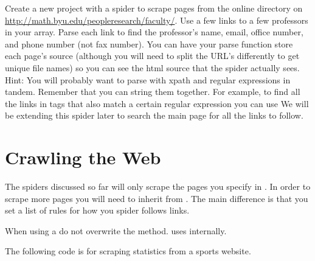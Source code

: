 \begin{problem}
Create a new project with a spider to scrape pages from the online directory on \url{http://math.byu.edu/peopleresearch/faculty/}. Use a few links to a few professors in your  array. Parse each link to find the professor's name, email, office number, and phone number (not fax number). You can have your parse function store each page's source (although you will need to split the URL's differently to get unique file names) so you can see the html source that the spider actually sees.
Hint: You will probably want to parse with xpath and regular expressions in tandem. Remember that you can string them together. For example, to find all the  links in  tags that also match a certain regular expression you can use 
We will be extending this spider later to search the main page for all the links to follow.
\end{problem}

\section*{Crawling the Web}
The spiders discussed so far will only scrape the pages you specify in . In order to scrape more pages you will need to inherit from . The main difference is that you set a list of rules for how you spider follows links.

\begin{warn}
When using a  do not overwrite the  method. 
 uses  internally.
\end{warn}

The following code is for scraping statistics from a sports website.

